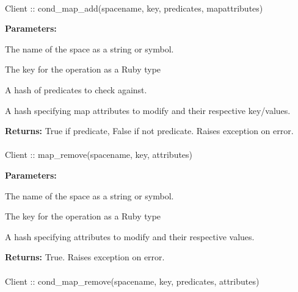 \paragraph{}
\label{api:ruby:cond_map_add}
\begin{rubycode}
Client :: cond_map_add(spacename, key, predicates, mapattributes)
\end{rubycode}


\noindent\textbf{Parameters:}
\begin{description}[labelindent=\widthof{{\code{mapattributes}}},leftmargin=*,noitemsep,nolistsep,align=right]
\item[\code{spacename}] The name of the space as a string or symbol.
\item[\code{key}] The key for the operation as a Ruby type
\item[\code{predicates}] A hash of predicates to check against.
\item[\code{mapattributes}] A hash specifying map attributes to modify and their respective key/values.
\end{description}

\noindent\textbf{Returns:}
True if predicate, False if not predicate.  Raises exception on error.

\paragraph{}
\label{api:ruby:map_remove}
\begin{rubycode}
Client :: map_remove(spacename, key, attributes)
\end{rubycode}


\noindent\textbf{Parameters:}
\begin{description}[labelindent=\widthof{{\code{attributes}}},leftmargin=*,noitemsep,nolistsep,align=right]
\item[\code{spacename}] The name of the space as a string or symbol.
\item[\code{key}] The key for the operation as a Ruby type
\item[\code{attributes}] A hash specifying attributes to modify and their respective values.
\end{description}

\noindent\textbf{Returns:}
True.  Raises exception on error.

\paragraph{}
\label{api:ruby:cond_map_remove}
\begin{rubycode}
Client :: cond_map_remove(spacename, key, predicates, attributes)
\end{rubycode}


